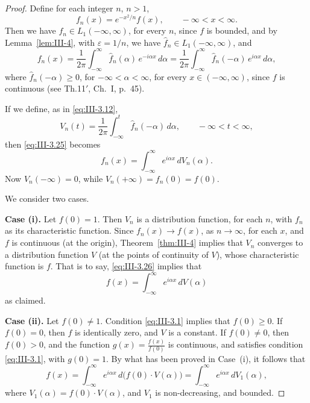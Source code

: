 \begin{proof}
Define for each integer $n$, $n>1$,
\[
f_{n}(x)=e^{-x^{2}/n}f(x),\qquad-\infty<x<\infty.
\]
Then we have $f_{n}\in L_{1}(-\infty,\infty)$, for every $n$, since $f$ is bounded, and by Lemma~\ref{lem:III-4}, with $\varepsilon=1/n$, we have $\hat f_{n}\in L_{1}(-\infty,\infty)$, and
\begin{equation}\tag{3.25}\label{eq:III-3.25}
f_{n}(x)=\frac{1}{2\pi}\int_{-\infty}^{\infty}\hat f_{n}(\alpha)\,e^{-i\alpha x}\,d\alpha
=\frac{1}{2\pi}\int_{-\infty}^{\infty}\hat f_{n}(-\alpha)\,e^{i\alpha x}\,d\alpha,
\end{equation}
where $\hat f_{n}(-\alpha)\ge0$, for $-\infty<\alpha<\infty$, for every $x\in(-\infty,\infty)$, since $f$ is continuous (see Th.11$'$, Ch.~I, p.~45).

If we define, as in \eqref{eq:III-3.12},
\[
V_{n}(t)=\frac{1}{2\pi}\int_{-\infty}^{t}\hat f_{n}(-\alpha)\,d\alpha,\qquad-\infty<t<\infty,
\]
then \eqref{eq:III-3.25} becomes
\begin{equation}\tag{3.26}\label{eq:III-3.26}
f_{n}(x)=\int_{-\infty}^{\infty}e^{i\alpha x}\,dV_{n}(\alpha).
\end{equation}
Now $V_{n}(-\infty)=0$, while $V_{n}(+\infty)=f_{n}(0)=f(0)$.

We consider two cases.

\noindent\textbf{Case (i).} Let $f(0)=1$. Then $V_{n}$ is a distribution function, for each $n$, with $f_{n}$ as its characteristic function. Since $f_{n}(x)\to f(x)$, as $n\to\infty$, for each $x$, and $f$ is continuous (at the origin), Theorem~\ref{thm:III-4} implies that $V_{n}$ converges to a distribution function $V$ (at the points of continuity of $V$), whose characteristic function is $f$. That is to say, \eqref{eq:III-3.26} implies that
\[
f(x)=\int_{-\infty}^{\infty}e^{i\alpha x}\,dV(\alpha)
\]
as claimed.

\noindent\textbf{Case (ii).} Let $f(0)\neq1$. Condition \eqref{eq:III-3.1} implies that $f(0)\ge0$. If $f(0)=0$, then $f$ is identically zero, and $V$ is a constant. If $f(0)\neq0$, then $f(0)>0$, and the function $g(x)=\frac{f(x)}{f(0)}$ is continuous, and satisfies condition \eqref{eq:III-3.1}, with $g(0)=1$. By what has been proved in Case~(i), it follows that
\[
f(x)=\int_{-\infty}^{\infty}e^{i\alpha x}\,d\bigl(f(0)\cdot V(\alpha)\bigr)
=\int_{-\infty}^{\infty}e^{i\alpha x}\,dV_{1}(\alpha),
\]
where $V_{1}(\alpha)=f(0)\cdot V(\alpha)$, and $V_{1}$ is non-decreasing, and bounded.
\end{proof}

